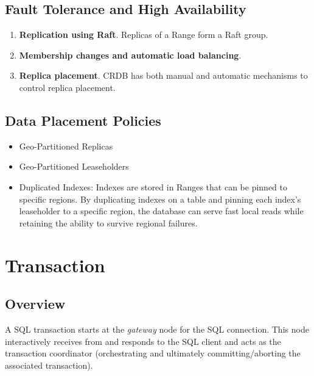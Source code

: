 \documentclass[11pt]{article}
\begin{document}
\subsection{Fault Tolerance and High Availability}
\label{sec:orgd41165a}
\begin{enumerate}
\item \textbf{Replication using Raft}. Replicas of a Range form a Raft group.
\item \textbf{Membership changes and automatic load balancing}.
\item \textbf{Replica placement}. CRDB has both manual and automatic mechanisms to control replica placement.
\end{enumerate}
\subsection{Data Placement Policies}
\label{sec:org0970cc8}
\begin{itemize}
\item Geo-Partitioned Replicas
\item Geo-Partitioned Leaseholders
\item Duplicated Indexes: Indexes are stored in Ranges that can be pinned to specific regions. By
duplicating indexes on a table and pinning each index's leaseholder to a specific region, the
database can serve fast local reads while retaining the ability to survive regional failures.
\end{itemize}
\section{Transaction}
\label{sec:orgc392752}
\subsection{Overview}
\label{sec:org340442f}
A SQL transaction starts at the \emph{gateway} node for the SQL connection. This node interactively receives
from and responds to the SQL client and acts as the transaction coordinator (orchestrating and
ultimately committing/aborting the associated transaction).
\end{document}

